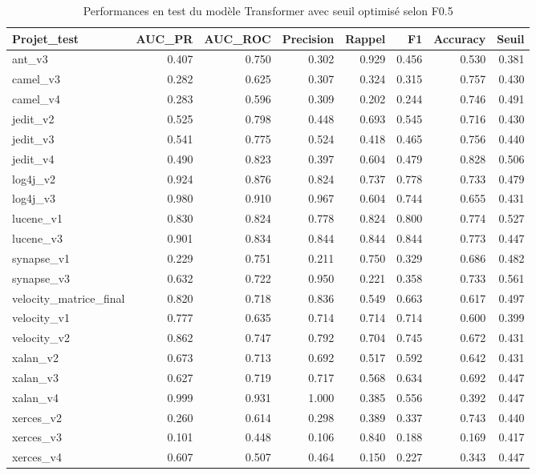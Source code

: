\begin{table}
\caption{Performances en test du modèle Transformer avec seuil optimisé selon F0.5}
\label{tab:transformer_f05}
\begin{tabular}{lrrrrrrr}
\toprule
Projet_test & AUC_PR & AUC_ROC & Precision & Rappel & F1 & Accuracy & Seuil \\
\midrule
ant_v3 & 0.407 & 0.750 & 0.302 & 0.929 & 0.456 & 0.530 & 0.381 \\
camel_v3 & 0.282 & 0.625 & 0.307 & 0.324 & 0.315 & 0.757 & 0.430 \\
camel_v4 & 0.283 & 0.596 & 0.309 & 0.202 & 0.244 & 0.746 & 0.491 \\
jedit_v2 & 0.525 & 0.798 & 0.448 & 0.693 & 0.545 & 0.716 & 0.430 \\
jedit_v3 & 0.541 & 0.775 & 0.524 & 0.418 & 0.465 & 0.756 & 0.440 \\
jedit_v4 & 0.490 & 0.823 & 0.397 & 0.604 & 0.479 & 0.828 & 0.506 \\
log4j_v2 & 0.924 & 0.876 & 0.824 & 0.737 & 0.778 & 0.733 & 0.479 \\
log4j_v3 & 0.980 & 0.910 & 0.967 & 0.604 & 0.744 & 0.655 & 0.431 \\
lucene_v1 & 0.830 & 0.824 & 0.778 & 0.824 & 0.800 & 0.774 & 0.527 \\
lucene_v3 & 0.901 & 0.834 & 0.844 & 0.844 & 0.844 & 0.773 & 0.447 \\
synapse_v1 & 0.229 & 0.751 & 0.211 & 0.750 & 0.329 & 0.686 & 0.482 \\
synapse_v3 & 0.632 & 0.722 & 0.950 & 0.221 & 0.358 & 0.733 & 0.561 \\
velocity_matrice_final & 0.820 & 0.718 & 0.836 & 0.549 & 0.663 & 0.617 & 0.497 \\
velocity_v1 & 0.777 & 0.635 & 0.714 & 0.714 & 0.714 & 0.600 & 0.399 \\
velocity_v2 & 0.862 & 0.747 & 0.792 & 0.704 & 0.745 & 0.672 & 0.431 \\
xalan_v2 & 0.673 & 0.713 & 0.692 & 0.517 & 0.592 & 0.642 & 0.431 \\
xalan_v3 & 0.627 & 0.719 & 0.717 & 0.568 & 0.634 & 0.692 & 0.447 \\
xalan_v4 & 0.999 & 0.931 & 1.000 & 0.385 & 0.556 & 0.392 & 0.447 \\
xerces_v2 & 0.260 & 0.614 & 0.298 & 0.389 & 0.337 & 0.743 & 0.440 \\
xerces_v3 & 0.101 & 0.448 & 0.106 & 0.840 & 0.188 & 0.169 & 0.417 \\
xerces_v4 & 0.607 & 0.507 & 0.464 & 0.150 & 0.227 & 0.343 & 0.447 \\
\bottomrule
\end{tabular}
\end{table}
